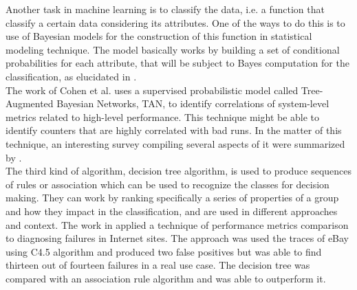 Another task in machine learning is to classify the data, i.e. a function that classify a certain data considering its attributes. One of the ways to do this is to use of Bayesian models for the construction of this function in statistical modeling technique. The model basically works by building a set of conditional probabilities for each attribute, that will be subject to Bayes computation for the classification, as elucidated in  \cite{bayes}. \\
The work of Cohen et al. \cite{cohen} uses a supervised probabilistic model called Tree-Augmented Bayesian Networks, TAN, to identify correlations of system-level metrics related to high-level performance. This technique might be able to identify counters that are highly correlated with bad runs. In the matter of this technique, an interesting survey compiling several aspects of it were summarized by \cite{discrete_bayesian}.\\
The third kind of algorithm, decision tree algorithm, is used to produce sequences  of  rules or association which can  be  used  to recognize the classes for decision making. They can work by ranking specifically a series of properties of a group and how they impact in the classification, and are used in different approaches and context. The work in \cite{decision_tree} applied a technique of performance metrics comparison to diagnosing failures in Internet sites.  The approach was used the traces of eBay using C4.5 algorithm and produced two false positives but was able to find thirteen out of fourteen failures in a real use case. The decision tree was compared with an association rule algorithm and was able to outperform it.\\

